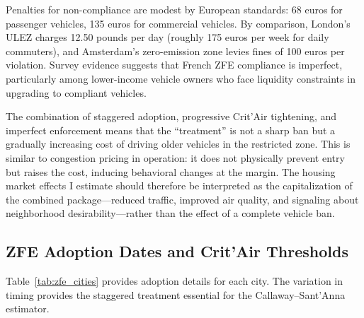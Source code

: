 \documentclass[12pt]{article}
\begin{document}
Penalties for non-compliance are modest by European standards: 68 euros for passenger vehicles, 135 euros for commercial vehicles. By comparison, London's ULEZ charges 12.50 pounds per day (roughly 175 euros per week for daily commuters), and Amsterdam's zero-emission zone levies fines of 100 euros per violation. Survey evidence suggests that French ZFE compliance is imperfect, particularly among lower-income vehicle owners who face liquidity constraints in upgrading to compliant vehicles.

The combination of staggered adoption, progressive Crit'Air tightening, and imperfect enforcement means that the ``treatment'' is not a sharp ban but a gradually increasing cost of driving older vehicles in the restricted zone. This is similar to congestion pricing in operation: it does not physically prevent entry but raises the cost, inducing behavioral changes at the margin. The housing market effects I estimate should therefore be interpreted as the capitalization of the combined package---reduced traffic, improved air quality, and signaling about neighborhood desirability---rather than the effect of a complete vehicle ban.

\subsection{ZFE Adoption Dates and Crit'Air Thresholds}

Table~\ref{tab:zfe_cities} provides adoption details for each city. The variation in timing provides the staggered treatment essential for the Callaway--Sant'Anna estimator.
\end{document}
